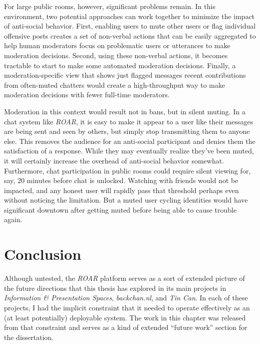 For large public rooms, however, significant problems remain. In this environment, two potential approaches can work together to minimize the impact of anti-social behavior. First, enabling users to mute other users or flag individual offensive posts creates a set of non-verbal actions that can be easily aggregated to help human moderators focus on problematic users or utterances to make moderation decisions. Second, using these non-verbal actions, it becomes tractable to start to make some automated moderation decisions. Finally, a moderation-specific view that shows just flagged messages recent contributions from often-muted chatters would create a high-throughput way to make moderation decisions with fewer full-time moderators.

Moderation in this context would result not in bans, but in silent muting. In a chat system like \emph{ROAR}, it is easy to make it appear to a user like their messages are being sent and seen by others, but simply stop transmitting them to anyone else. This removes the audience for an anti-social participant and denies them the satisfaction of a response. While they may eventually realize they've been muted, it will certainly increase the overhead of anti-social behavior somewhat. Furthermore, chat participation in public rooms could require silent viewing for, say, 20 minutes before chat is unlocked. Watching with friends would not be impacted, and any honest user will rapidly pass that threshold perhaps even without noticing the limitation. But a muted user cycling identities would have significant downtown after getting muted before being able to cause trouble again.




\section{Conclusion}

Although untested, the \emph{ROAR} platform serves as a sort of extended picture of the future directions that this thesis has explored in its main projects in \emph{Information & Presentation Spaces}, \emph{backchan.nl}, and \emph{Tin Can}. In each of these projects, I had the implicit constraint that it needed to operate effectively as an (at least potentially) deployable system. The work in this chapter was released from that constraint and serves as a kind of extended ``future work'' section for the dissertation.

